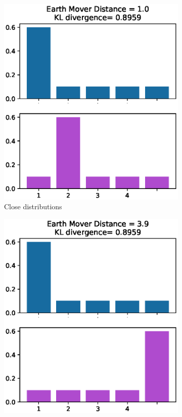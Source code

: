 \begin{figure}[h!]
    \begin{subfigure}{.5\textwidth}
        \centering
        \includegraphics[width=1.0\linewidth]{figures/graphs/EMDvsKLclose.eps}
        \caption{Close distributions}
        \label{fig:closedist}
    \end{subfigure}%
    \begin{subfigure}{.5\textwidth}
        \centering
        \includegraphics[width=1.0\linewidth]{figures/graphs/EMDvsKLfar.eps}

\end{subfigure}
\end{figure}
